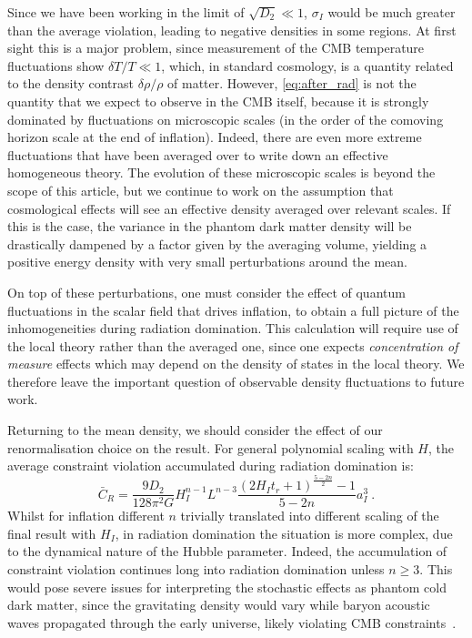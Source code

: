 \documentclass[amsmath,amssymb,11pt]{article}
\begin{document}
Since we have been working in the limit of $\sqrt{D_2} \ll 1$, $\sigma_I$ would be much greater than the average violation, leading to negative densities in some regions. At first sight this is a major problem, since measurement of the CMB temperature fluctuations show $\delta T/T \ll 1$, which, in standard cosmology, is a quantity related to the density contrast $\delta \rho/\rho$ of matter. However, \eqref{eq:after_rad} is not the quantity that we expect to observe in the CMB itself, because it is strongly dominated by fluctuations on microscopic scales (in the order of the comoving horizon scale at the end of inflation). Indeed, there are even more extreme fluctuations that have been averaged over to write down an effective homogeneous theory. The evolution of these microscopic scales is beyond the scope of this article, but we continue to work on the assumption that cosmological effects will see an effective density averaged over relevant scales. 
 If this is the case, the variance in the phantom dark matter density will be drastically dampened by a factor given by the averaging volume, yielding a positive energy density with very small perturbations around the mean.  
 
 On top of these perturbations, one must consider the effect of quantum fluctuations in the scalar field that drives inflation, to obtain a full picture of the inhomogeneities during radiation domination. This calculation will require use of the local theory rather than the averaged one, since one expects {\it concentration of measure} effects which may depend on the density of states in the local theory. We therefore leave the important question of observable density fluctuations to future work.

Returning to the mean density, we should consider the effect of our renormalisation choice on the result. For general polynomial scaling with $H$, the average constraint violation accumulated during radiation domination is:
\begin{equation}
    \bar{C}_R =  \frac{9 D_2}{128 \pi^2 G}H_I^{n-1}L^{n-3} \frac{(2 H_I t_r +1)^{\frac{5-2n}{2}}-1}{5-2n} a_I^3 \ .
\end{equation}
Whilst for inflation different $n$ trivially translated into different scaling of the final result with $H_I$, in radiation domination the situation is more complex, due to the dynamical nature of the Hubble parameter. Indeed, the accumulation of constraint violation continues long into radiation domination unless $n\geq 3$. This would pose severe issues for interpreting the stochastic effects as phantom cold dark matter, since the gravitating density would vary while baryon acoustic waves propagated through the early universe, likely violating CMB constraints~\cite{akrami2020planck}.
\end{document}
